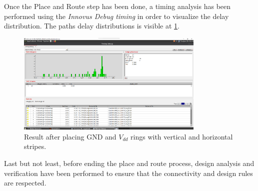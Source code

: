 Once the Place and Route step has been done, a timing analysis has been performed using the \textit{Innovus Debug timing} in order to visualize the delay distribution. The paths delay distributions is visible at \ref{fig:innovus_delay}.
\begin{figure}[h]   
    \centering
    \includegraphics[width=0.8\textwidth]{chapters/9_PhysicalDesign/images/innvous_delay.png}
    \caption{Result after placing GND and $V_{dd}$ rings with vertical and horizontal stripes.}
    \label{fig:innovus_delay}
\end{figure}

Last but not least, before ending the place and route process, design analysis and verification have been performed to ensure that the connectivity and design rules are respected.